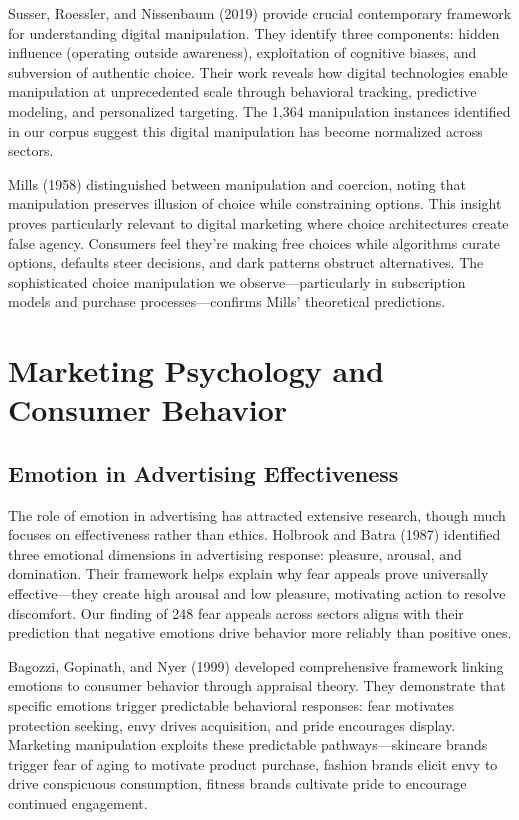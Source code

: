 Susser, Roessler, and Nissenbaum (2019) provide crucial contemporary framework for understanding digital manipulation. They identify three components: hidden influence (operating outside awareness), exploitation of cognitive biases, and subversion of authentic choice. Their work reveals how digital technologies enable manipulation at unprecedented scale through behavioral tracking, predictive modeling, and personalized targeting. The 1,364 manipulation instances identified in our corpus suggest this digital manipulation has become normalized across sectors.

Mills (1958) distinguished between manipulation and coercion, noting that manipulation preserves illusion of choice while constraining options. This insight proves particularly relevant to digital marketing where choice architectures create false agency. Consumers feel they're making free choices while algorithms curate options, defaults steer decisions, and dark patterns obstruct alternatives. The sophisticated choice manipulation we observe—particularly in subscription models and purchase processes—confirms Mills' theoretical predictions.

\section{Marketing Psychology and Consumer Behavior}
\label{sec:marketing_psych}

\subsection{Emotion in Advertising Effectiveness}

The role of emotion in advertising has attracted extensive research, though much focuses on effectiveness rather than ethics. Holbrook and Batra (1987) identified three emotional dimensions in advertising response: pleasure, arousal, and domination. Their framework helps explain why fear appeals prove universally effective—they create high arousal and low pleasure, motivating action to resolve discomfort. Our finding of 248 fear appeals across sectors aligns with their prediction that negative emotions drive behavior more reliably than positive ones.

Bagozzi, Gopinath, and Nyer (1999) developed comprehensive framework linking emotions to consumer behavior through appraisal theory. They demonstrate that specific emotions trigger predictable behavioral responses: fear motivates protection seeking, envy drives acquisition, and pride encourages display. Marketing manipulation exploits these predictable pathways—skincare brands trigger fear of aging to motivate product purchase, fashion brands elicit envy to drive conspicuous consumption, fitness brands cultivate pride to encourage continued engagement.


